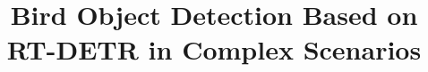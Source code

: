 \documentclass[journal]{IEEEtran}
\begin{document}
    \title{Bird Object Detection Based on RT-DETR in Complex Scenarios}
    \maketitle
    
    
    
    \printbibliography
\end{document}
